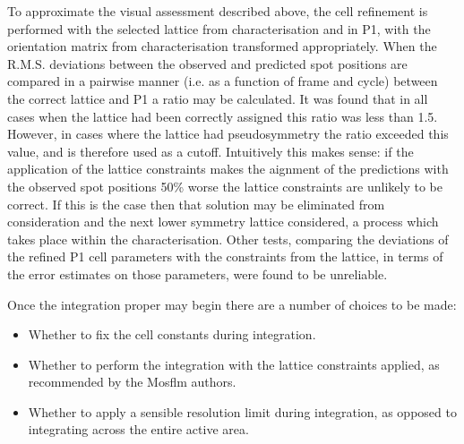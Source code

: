 \documentclass[preprint,pdf]{iucr}
\begin{document}
To approximate the visual assessment described above, the cell
refinement is performed with the selected lattice from
characterisation and in P1, with the orientation matrix from
characterisation transformed appropriately. When the R.M.S. deviations
between the observed and predicted spot positions are compared in a
pairwise manner (i.e. as a function of frame and cycle) between the
correct lattice and P1 a ratio may be calculated. It was found that in
all cases when the lattice had been correctly assigned this ratio was
less than 1.5. However, in cases where the lattice had pseudosymmetry
the ratio exceeded this value, and is therefore used as a
cutoff. Intuitively this makes sense: if the application of the
lattice constraints makes the aignment of the predictions with the
observed spot positions 50\% worse the lattice constraints are
unlikely to be correct. If this is the case then that solution may be
eliminated from consideration and the next lower symmetry lattice
considered, a process which takes place within the characterisation.
Other tests, comparing the deviations of the refined P1 cell
parameters with the constraints from the lattice, in terms of the
error estimates on those parameters, were found to be unreliable.

Once the integration proper may begin there are a number of choices to
be made:

\begin{itemize}
\item{Whether to fix the cell constants during integration.}
\item{Whether to perform the integration with the lattice constraints
    applied, as recommended by the Mosflm authors.}
\item{Whether to apply a sensible resolution limit during integration,
    as opposed to integrating across the entire active area.}
\end{itemize}
\end{document}
